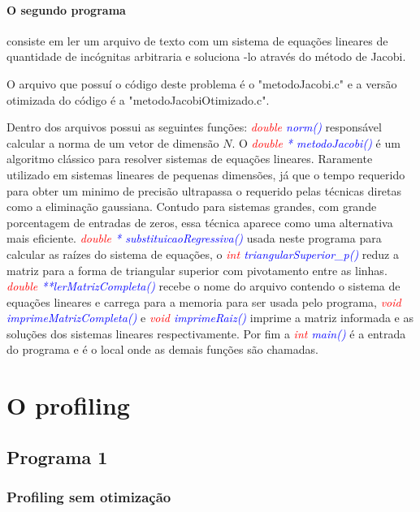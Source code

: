 \documentclass[]{article}
\begin{document}
\paragraph{O segundo programa} consiste em ler um arquivo de texto com um sistema de equações lineares de quantidade de incógnitas arbitraria e soluciona -lo através do método de Jacobi.

O arquivo que possuí o código deste problema é o "metodoJacobi.c" e a versão otimizada do código é a  "metodoJacobiOtimizado.c". 

Dentro dos arquivos possui as seguintes funções: \textit{\textcolor{red}{double} \textcolor{blue}{norm()}} responsável calcular a norma de um vetor de dimensão $N$. O \textit{\textcolor{red}{double} \textcolor{blue}{* metodoJacobi()}} é um algoritmo clássico para resolver sistemas de equações lineares. Raramente utilizado em sistemas lineares de pequenas dimensões, já que o tempo requerido para obter um minimo de precisão ultrapassa o requerido pelas técnicas diretas como a eliminação gaussiana. Contudo para sistemas grandes, com grande porcentagem de entradas de zeros, essa técnica aparece como uma alternativa mais eficiente. \textit{\textcolor{red}{double} \textcolor{blue}{* substituicaoRegressiva()}} usada neste programa para calcular as raízes do sistema de equações, o \textit{\textcolor{red}{int} \textcolor{blue}{ triangularSuperior\_p()}} reduz a matriz para a forma de triangular superior com pivotamento entre as linhas. \textit{\textcolor{red}{double} \textcolor{blue}{**lerMatrizCompleta()}} recebe o nome do arquivo contendo o sistema de equações lineares e carrega para a memoria para ser usada pelo programa, \textit{\textcolor{red}{void} \textcolor{blue}{ imprimeMatrizCompleta()}} e \textit{\textcolor{red}{void} \textcolor{blue}{imprimeRaiz()}} imprime a matriz informada e as soluções dos sistemas lineares respectivamente.  Por fim a \textit{\textcolor{red}{int} \textcolor{blue}{main()}} é a entrada do programa e é o local onde as demais funções são chamadas.

\section{O profiling}

\subsection{Programa 1}

\subsubsection{ Profiling sem otimização}
\end{document}
